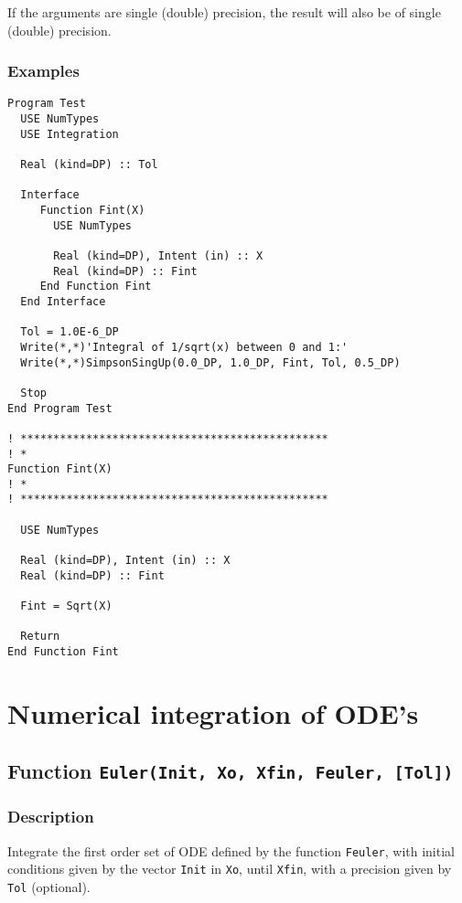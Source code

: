 If the arguments are single (double) precision, the result will also be of
single (double) precision. 


\subsubsection{Examples}

\begin{verbatim}
Program Test
  USE NumTypes
  USE Integration

  Real (kind=DP) :: Tol

  Interface 
     Function Fint(X)
       USE NumTypes

       Real (kind=DP), Intent (in) :: X
       Real (kind=DP) :: Fint
     End Function Fint
  End Interface

  Tol = 1.0E-6_DP
  Write(*,*)'Integral of 1/sqrt(x) between 0 and 1:'
  Write(*,*)SimpsonSingUp(0.0_DP, 1.0_DP, Fint, Tol, 0.5_DP)

  Stop
End Program Test

! ***********************************************
! *
Function Fint(X)
! *  
! ***********************************************

  USE NumTypes

  Real (kind=DP), Intent (in) :: X
  Real (kind=DP) :: Fint

  Fint = Sqrt(X)

  Return
End Function Fint
\end{verbatim}

\section{Numerical integration of ODE's}

\subsection{Function \texttt{Euler(Init, Xo, Xfin, Feuler, [Tol])}}

\subsubsection{Description}

Integrate the first order set of ODE defined by the function
\texttt{Feuler}, with initial conditions given by the vector
\texttt{Init} in \texttt{Xo}, until \texttt{Xfin}, with a precision
given by \texttt{Tol} (optional).

